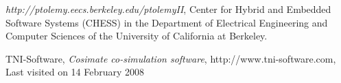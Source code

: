 \begin{thebibliography}{14}

 {\em http://ptolemy.eecs.berkeley.edu/ptolemyII},
	Center for Hybrid and Embedded Software Systems (CHESS) in the
	Department of Electrical Engineering and Computer Sciences of
	the University of California at Berkeley.









 TNI-Software,
	{\em Cosimate co-simulation software},
	http://www.tni-software.com,
	Last visited on 14 February 2008




\end{thebibliography}
